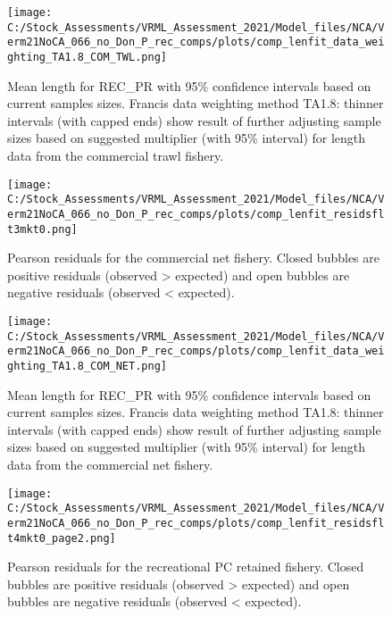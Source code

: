 \documentclass[11pt,
  english,
  a4paper,
]{article}
\begin{document}
\begin{figure}
\centering
\texttt{[image: C:/Stock\_Assessments/VRML\_Assessment\_2021/Model\_files/NCA/Verm21NoCA\_066\_no\_Don\_P\_rec\_comps/plots/comp\_lenfit\_data\_weighting\_TA1.8\_COM\_TWL.png]}
\caption{Mean length for REC\_PR with 95\% confidence intervals based on current samples sizes. Francis data weighting method TA1.8: thinner intervals (with capped ends) show result of further adjusting sample sizes based on suggested multiplier (with 95\% interval) for length data from the commercial trawl fishery.\label{fig:mean-len-fit-COM-TWL}}
\end{figure}

\begin{figure}
\centering
\texttt{[image: C:/Stock\_Assessments/VRML\_Assessment\_2021/Model\_files/NCA/Verm21NoCA\_066\_no\_Don\_P\_rec\_comps/plots/comp\_lenfit\_residsflt3mkt0.png]}
\caption{Pearson residuals for the commercial net fishery. Closed bubbles are positive residuals (observed \textgreater{} expected) and open bubbles are negative residuals (observed \textless{} expected).\label{fig:len-pearson-COM-NET}}
\end{figure}

\begin{figure}
\centering
\texttt{[image: C:/Stock\_Assessments/VRML\_Assessment\_2021/Model\_files/NCA/Verm21NoCA\_066\_no\_Don\_P\_rec\_comps/plots/comp\_lenfit\_data\_weighting\_TA1.8\_COM\_NET.png]}
\caption{Mean length for REC\_PR with 95\% confidence intervals based on current samples sizes. Francis data weighting method TA1.8: thinner intervals (with capped ends) show result of further adjusting sample sizes based on suggested multiplier (with 95\% interval) for length data from the commercial net fishery.\label{fig:mean-len-fit-COM-NET}}
\end{figure}

\begin{figure}
\centering
\texttt{[image: C:/Stock\_Assessments/VRML\_Assessment\_2021/Model\_files/NCA/Verm21NoCA\_066\_no\_Don\_P\_rec\_comps/plots/comp\_lenfit\_residsflt4mkt0\_page2.png]}
\caption{Pearson residuals for the recreational PC retained fishery. Closed bubbles are positive residuals (observed \textgreater{} expected) and open bubbles are negative residuals (observed \textless{} expected).\label{fig:len-pearson-REC-PC}}
\end{figure}
\end{document}

